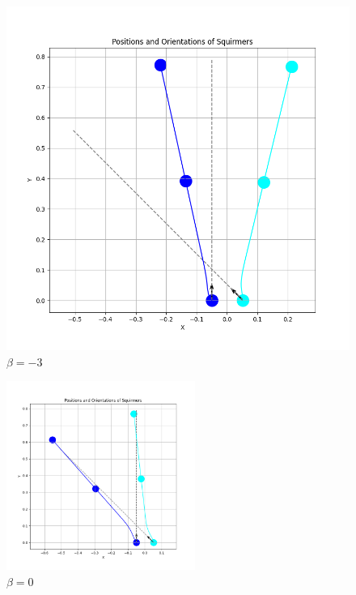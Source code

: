 \documentclass{article}
\begin{document}
\begin{figure}[H]
\begin{minipage}{0.49\textwidth}
        \caption{\footnotesize $\beta = -1.5$}
    \end{minipage}\hfill
    \begin{minipage}{0.49\textwidth}
        \includegraphics[width=1.1\textwidth]{graphs/simulations/sim_sq_sq/betam3/3pi_4_.png}
        \caption{\footnotesize $\beta = -3$}
    \end{minipage}
\end{figure}
\begin{figure}[H]
    \centering
    \includegraphics[width=0.55\textwidth]{graphs/simulations/sim_sq_sq/beta0/3pi_4_.png}
    \caption{\footnotesize $\beta = 0$}
\end{figure}
\end{document}

